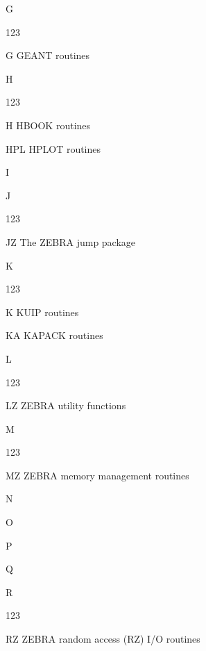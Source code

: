 \begin{DLtt}{1}
\item[G]

\begin{DLtt}{123}
\item[G]GEANT routines
\end{DLtt}

\item[H]

\begin{DLtt}{123}
\item[H]HBOOK routines
\item[HPL]HPLOT routines
\end{DLtt}

\item[I]

\item[J]

\begin{DLtt}{123}
\item[JZ]The ZEBRA jump package
\end{DLtt}

\item[K]

\begin{DLtt}{123}
\item[K]KUIP routines
\item[KA]KAPACK routines
\end{DLtt}

\item[L]

\begin{DLtt}{123}
\item[LZ]ZEBRA utility functions
\end{DLtt}

\item[M]

\begin{DLtt}{123}
\item[MZ]ZEBRA memory management routines
\end{DLtt}

\item[N]

\item[O]

\item[P]

\item[Q]

\item[R]

\begin{DLtt}{123}
\item[RZ]ZEBRA random access (RZ) I/O routines
\end{DLtt}


\end{DLtt}
